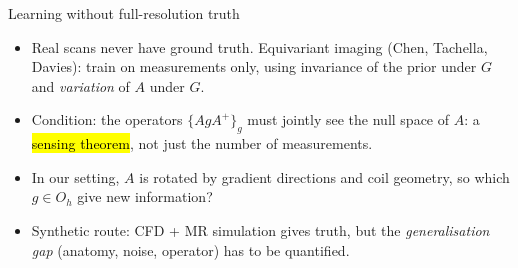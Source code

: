\iflong
\begin{frame}{Learning without full-resolution truth}
\begin{itemize}
\item Real scans never have ground truth. Equivariant imaging (Chen, Tachella, Davies): train on measurements only, using invariance of the prior under $G$ and \emph{variation} of $A$ under $G$.
\item Condition: the operators $\{AgA^{+}\}_{g}$ must jointly see the null space of $A$: a \hl{sensing theorem}, not just the number of measurements.
\item In our setting, $A$ is rotated by gradient directions and coil geometry, so which $g\in O_h$ give new information?
\item Synthetic route: CFD + MR simulation gives truth, but the \emph{generalisation gap} (anatomy, noise, operator) has to be quantified.
\end{itemize}
\end{frame}
\fi
